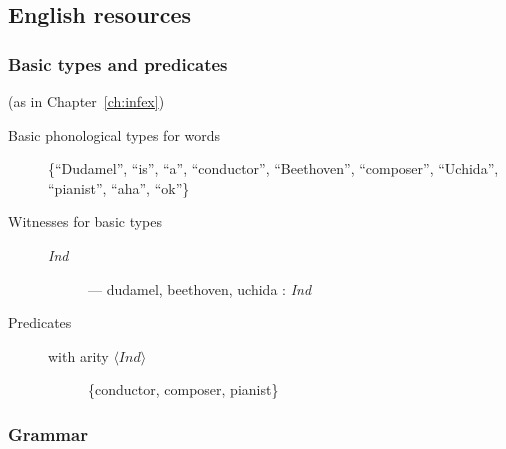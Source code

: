 \subsection{English resources} 

\subsubsection{Basic types and predicates} (as in Chapter~\ref{ch:infex})

\begin{description}

  
\item[Basic phonological  types for words] \mbox{}

  \{``Dudamel'', ``is'', ``a'', ``conductor'', ``Beethoven'',
  ``composer'', ``Uchida'', ``pianist'', ``aha'', ``ok''\}

\item [Witnesses for basic types] \mbox{}

  \begin{description}
\item[\textnormal{\textit{Ind}}] --- dudamel, beethoven, uchida :
  \textit{Ind}
  \end{description}

  
\item[Predicates] \mbox{}
  
  \begin{description}
  
  \item[with arity \textnormal{$\langle\textit{Ind}\rangle$}] \{conductor, composer, pianist\}
  \end{description}
  

\end{description}

\subsubsection{Grammar}

